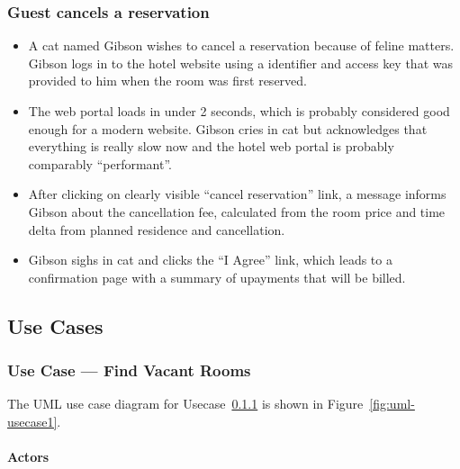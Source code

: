 \subsubsection{Guest cancels a reservation}\label{scenario3}
% 
% 
% 
\begin{itemize}
  \item A cat named Gibson wishes to cancel a reservation because of feline
      matters.  Gibson logs in to the hotel website using a identifier and
        access key that was provided to him when the room was first reserved.

  \item The web portal loads in under 2 seconds, which is probably considered good
        enough for a modern website. Gibson cries in cat but acknowledges that
        everything is really slow now and the hotel web portal is probably
        comparably ``performant''.

  \item After clicking on clearly visible ``cancel reservation'' link, a
      message informs Gibson about the cancellation fee, calculated from the
        room price and time delta from planned residence and cancellation.
      
  \item Gibson sighs in cat and clicks the ``I Agree'' link, which leads to a
      confirmation page with a summary of upayments that will be billed.
\end{itemize}




\subsection{Use Cases}



\subsubsection{Use Case --- Find Vacant Rooms}\label{usecase1}
The UML use case diagram for Usecase~\ref{usecase1} is shown in Figure~\ref{fig:uml-usecase1}.

\paragraph{Actors}

